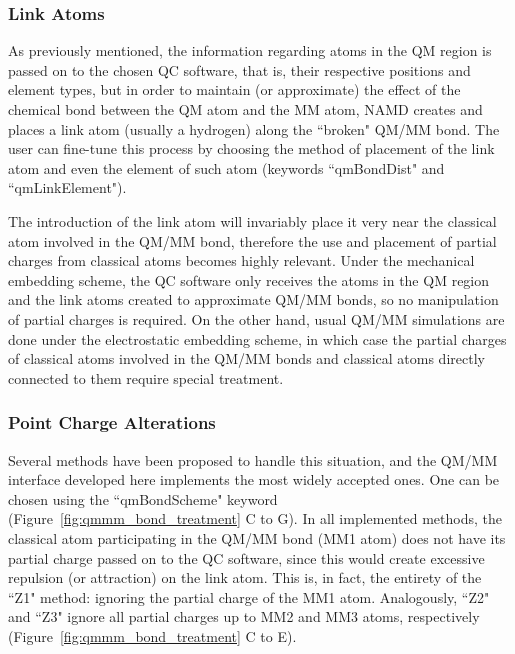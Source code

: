 \subsubsection{Link Atoms}

As previously mentioned, the information regarding atoms in the QM region 
is passed on to the chosen QC software, that is, their respective 
positions and element types, but in order to maintain (or approximate) 
the effect of the chemical bond between the QM atom and the MM atom, 
NAMD creates and places a link atom (usually a hydrogen) along the 
``broken" QM/MM bond. The user can fine-tune this process by choosing 
the method of placement of the link atom and even the element of 
such atom (keywords ``qmBondDist" and ``qmLinkElement").

The introduction of the link atom will invariably place it very near 
the classical atom involved in the QM/MM bond, therefore the use 
and placement of partial charges from classical atoms becomes
highly relevant. Under the mechanical embedding scheme, the QC software 
only receives the atoms in the QM region and the link atoms created
to approximate QM/MM bonds, so no manipulation of partial charges is 
required. On the other hand, usual QM/MM simulations are done under 
the electrostatic embedding scheme, in which case the partial charges
of classical atoms involved in the QM/MM bonds and classical atoms 
directly connected to them require special treatment.


\subsubsection{Point Charge Alterations}

Several methods have been proposed to handle this situation, and the 
QM/MM interface developed here implements the most widely accepted ones.
One can be chosen using the ``qmBondScheme" keyword
(Figure~\ref{fig:qmmm_bond_treatment} C to G). 
In all implemented methods, the classical atom participating in the 
QM/MM bond (MM1 atom) does not have its partial charge passed on 
to the QC software, since this would create excessive repulsion 
(or attraction) on the link atom. This is, in fact, the entirety of 
the ``Z1" method: ignoring the partial charge of the MM1 atom. 
Analogously, ``Z2" and ``Z3" ignore all partial charges up to 
MM2 and MM3 atoms, respectively
(Figure~\ref{fig:qmmm_bond_treatment} C to E).

